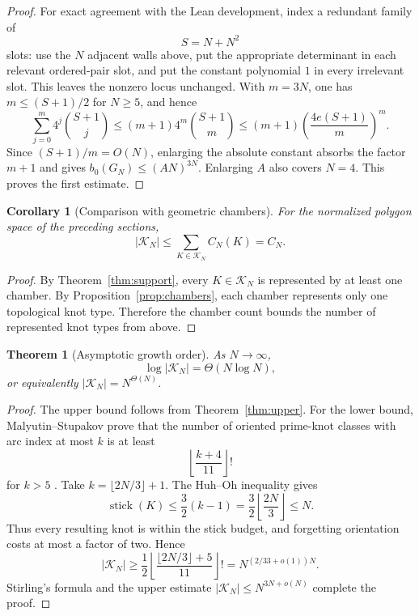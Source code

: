 \documentclass[11pt]{article}
\newtheorem{theorem}{Theorem}
\newtheorem{corollary}{Corollary}
\theoremstyle{remark}
\theoremstyle{plain}
\newcommand{\Kcal}{\mathcal{K}}
\begin{document}
\begin{proof}
For exact agreement with the Lean development, index a redundant family of
\[
    S=N+N^2
\]
slots: use the \(N\) adjacent walls above, put the appropriate determinant in
each relevant ordered-pair slot, and put the constant polynomial \(1\) in
every irrelevant slot.  This leaves the nonzero locus unchanged.  With
\(m=3N\), one has \(m\le(S+1)/2\) for \(N\ge5\), and hence
\[
 \sum_{j=0}^{m}4^j\binom{S+1}{j}
 \le (m+1)4^m\binom{S+1}{m}
 \le (m+1)\left(\frac{4e(S+1)}m\right)^m.
\]
Since \((S+1)/m=O(N)\), enlarging the absolute constant absorbs the factor
\(m+1\) and gives \(b_0(G_N)\le(AN)^{3N}\).  Enlarging \(A\) also covers
\(N=4\).  This proves the first estimate.

\end{proof}

\begin{corollary}[Comparison with geometric chambers]\label{cor:knot-types}
For the normalized polygon space of the preceding sections,
\[
    |\Kcal_N|
    \le
    \sum_{K\in\Kcal_N} C_N(K)
    =
    C_N.
\]
\end{corollary}

\begin{proof}
By Theorem~\ref{thm:support}, every \(K\in\Kcal_N\) is represented by at least
one chamber.  By Proposition~\ref{prop:chambers}, each chamber represents only
one topological knot type.  Therefore the chamber count bounds the number of
represented knot types from above.
\end{proof}

\begin{theorem}[Asymptotic growth order]\label{thm:asymptotic-order}
As \(N\to\infty\),
\[
    \log|\Kcal_N|=\Theta(N\log N),
\]
or equivalently \(|\Kcal_N|=N^{\Theta(N)}\).
\end{theorem}

\begin{proof}
The upper bound follows from Theorem~\ref{thm:upper}.  For the lower
bound, Malyutin--Stupakov prove that the number of oriented prime-knot classes
with arc index at most \(k\) is at least
\[
    \left\lfloor\frac{k+4}{11}\right\rfloor!
\]
for \(k>5\) \cite[Theorem 1]{MalyutinStupakovArc}.  Take
\(k=\lfloor2N/3\rfloor+1\).  The Huh--Oh inequality
\cite[Theorem 3]{HuhOh} gives
\[
    \operatorname{stick}(K)
    \le \frac32(k-1)
    =\frac32\left\lfloor\frac{2N}{3}\right\rfloor
    \le N.
\]
Thus every resulting knot is within the stick budget, and forgetting
orientation costs at most a factor of two.  Hence
\[
 |\Kcal_N|
 \ge \frac12
 \left\lfloor\frac{\lfloor2N/3\rfloor+5}{11}\right\rfloor!
 =N^{(2/33+o(1))N}.
\]
Stirling's formula and the upper estimate
\(|\Kcal_N|\le N^{3N+o(N)}\) complete the proof.
\end{proof}
\end{document}
